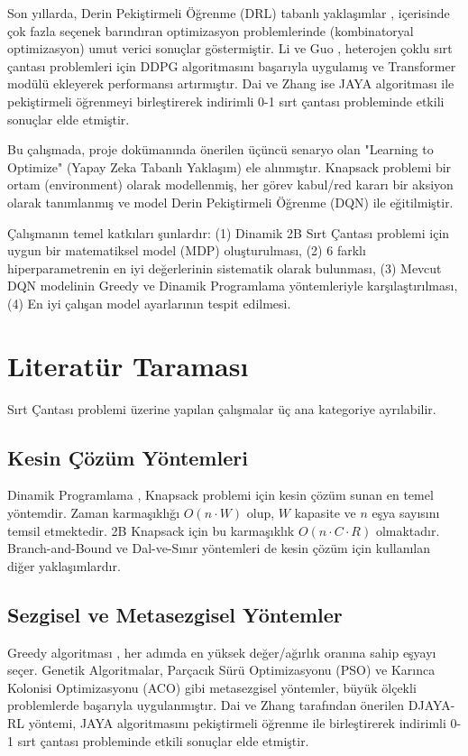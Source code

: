 \documentclass[onecolumn]{IEEEtran}
\begin{document}
Son yıllarda, Derin Pekiştirmeli Öğrenme (DRL) tabanlı yaklaşımlar ,  içerisinde çok fazla seçenek barındıran optimizasyon problemlerinde (kombinatoryal optimizasyon) umut verici sonuçlar göstermiştir. Li ve Guo \cite{li2026deep}, heterojen çoklu sırt çantası problemleri için DDPG algoritmasını başarıyla uygulamış ve Transformer modülü ekleyerek performansı artırmıştır. Dai ve Zhang \cite{dai2025djaya} ise JAYA algoritması ile pekiştirmeli öğrenmeyi birleştirerek indirimli 0-1 sırt çantası probleminde etkili sonuçlar elde etmiştir.

Bu çalışmada, proje dokümanında önerilen üçüncü senaryo olan "Learning to Optimize" (Yapay Zeka Tabanlı Yaklaşım) ele alınmıştır. Knapsack problemi bir ortam (environment) olarak modellenmiş, her görev kabul/red kararı bir aksiyon olarak tanımlanmış ve model Derin Pekiştirmeli Öğrenme (DQN) ile eğitilmiştir.

Çalışmanın temel katkıları şunlardır: (1) Dinamik 2B Sırt Çantası problemi için uygun bir matematiksel model (MDP) oluşturulması, (2) 6 farklı hiperparametrenin en iyi değerlerinin sistematik olarak bulunması, (3) Mevcut DQN modelinin Greedy ve Dinamik Programlama yöntemleriyle karşılaştırılması, (4) En iyi çalışan model ayarlarının tespit edilmesi.


\section{Literatür Taraması}

Sırt Çantası problemi üzerine yapılan çalışmalar üç ana kategoriye ayrılabilir.

\subsection{Kesin Çözüm Yöntemleri}

Dinamik Programlama \cite{kellerer2004knapsack}, Knapsack problemi için kesin çözüm sunan en temel yöntemdir. Zaman karmaşıklığı $O(n \cdot W)$ olup, $W$ kapasite ve $n$ eşya sayısını temsil etmektedir. 2B Knapsack için bu karmaşıklık $O(n \cdot C \cdot R)$ olmaktadır. Branch-and-Bound ve Dal-ve-Sınır yöntemleri de kesin çözüm için kullanılan diğer yaklaşımlardır.

\subsection{Sezgisel ve Metasezgisel Yöntemler}

Greedy algoritması \cite{martello1990knapsack}, her adımda en yüksek değer/ağırlık oranına sahip eşyayı seçer. Genetik Algoritmalar, Parçacık Sürü Optimizasyonu (PSO) ve Karınca Kolonisi Optimizasyonu (ACO) gibi metasezgisel yöntemler, büyük ölçekli problemlerde başarıyla uygulanmıştır. Dai ve Zhang \cite{dai2025djaya} tarafından önerilen DJAYA-RL yöntemi, JAYA algoritmasını pekiştirmeli öğrenme ile birleştirerek indirimli 0-1 sırt çantası probleminde etkili sonuçlar elde etmiştir.
\end{document}
